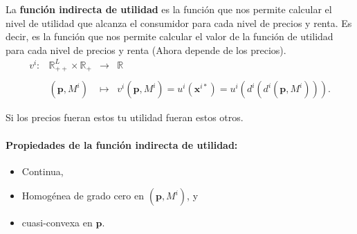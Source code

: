 La \textbf{función indirecta de utilidad} es la función que nos permite calcular el nivel de utilidad que alcanza el consumidor para cada nivel de precios y renta. Es decir, es la función que nos permite calcular el valor de la función de utilidad para cada nivel de precios y renta (Ahora depende de los precios). \\
$$
\begin{array}{rrcl}
    v^i: & \mathbb{R}_{++}^L \times \mathbb{R}_+ & \to &\mathbb{R}\\\\
	 & \left(\textbf{p},M^i\right) & \mapsto & v^i\left(\textbf{p},M^i\right) = u^i\left(\textbf{x}^{i*}\right)=u^i\left(d^i\left(d^i(\textbf{p},M^i)\right)\right).
\end{array}
$$

Si los precios fueran estos tu utilidad fueran estos otros. 

\paragraph{Propiedades de la función indirecta de utilidad:}

\begin{itemize}
    \item Continua,
    \item Homogénea de grado cero en $\left(\textbf{p},M^i\right)$, y
    \item cuasi-convexa en $\textbf{p}$.
\end{itemize}

